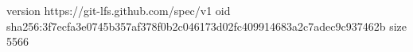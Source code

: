 version https://git-lfs.github.com/spec/v1
oid sha256:3f7ecfa3e0745b357af378f0b2c046173d02fc409914683a2c7adec9c937462b
size 5566
